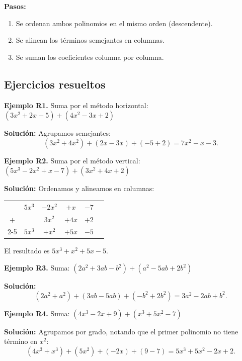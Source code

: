 \documentclass[12pt, letterpaper]{article}
\begin{document}
\begin{cuadropasos}
  \textbf{Pasos:}
  \begin{enumerate}[leftmargin=*]
    \item Se ordenan ambos polinomios en el mismo orden (descendente).
    \item Se alinean los términos semejantes en columnas.
    \item Se suman los coeficientes columna por columna.
  \end{enumerate}
\end{cuadropasos}

\subsection{Ejercicios resueltos}

\textbf{Ejemplo R1.} Suma por el método horizontal: $(3x^2 + 2x - 5) + (4x^2 - 3x + 2)$

\begin{cuadrosolucion}
  \textbf{Solución:} Agrupamos semejantes:
  $$(3x^2 + 4x^2) + (2x - 3x) + (-5 + 2) = 7x^2 - x - 3.$$
\end{cuadrosolucion}

\textbf{Ejemplo R2.} Suma por el método vertical: $(5x^3 - 2x^2 + x - 7) + (3x^2 + 4x + 2)$

\begin{cuadrosolucion}
  \textbf{Solución:} Ordenamos y alineamos en columnas:
  \begin{center}
    \begin{tabular}{cccccc}
          & $5x^3$ & $-2x^2$ & $+x$  & $-7$ & \\
      $+$ &        & $3x^2$  & $+4x$ & $+2$ & \\
      \cline{2-5}
          & $5x^3$ & $+x^2$  & $+5x$ & $-5$ &
    \end{tabular}
  \end{center}
  El resultado es $5x^3 + x^2 + 5x - 5$.
\end{cuadrosolucion}

\textbf{Ejemplo R3.} Suma: $(2a^2 + 3ab - b^2) + (a^2 - 5ab + 2b^2)$

\begin{cuadrosolucion}
  \textbf{Solución:}
  $$(2a^2 + a^2) + (3ab - 5ab) + (-b^2 + 2b^2) = 3a^2 - 2ab + b^2.$$
\end{cuadrosolucion}

\textbf{Ejemplo R4.} Suma: $(4x^3 - 2x + 9) + (x^3 + 5x^2 - 7)$

\begin{cuadrosolucion}
  \textbf{Solución:} Agrupamos por grado, notando que el primer polinomio no tiene término en $x^2$:
  $$(4x^3 + x^3) + (5x^2) + (-2x) + (9 - 7) = 5x^3 + 5x^2 - 2x + 2.$$
\end{cuadrosolucion}
\end{document}
